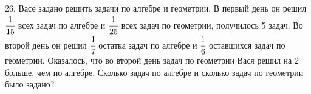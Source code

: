 26. Васе задано решить задачи по алгебре и геометрии. В первый день он решил $\cfrac{1}{15}$ всех задач по алгебре и $\cfrac{1}{25}$ всех задач по геометрии, получилось 5 задач. Во второй день он решил $\cfrac{1}{7}$ остатка задач по алгебре и $\cfrac{1}{6}$ оставшихся задач по геометрии. Оказалось, что во второй день задач по геометрии Вася решил на 2 больше, чем по алгебре. Сколько задач по алгебре и сколько задач по геометрии было задано?\\

